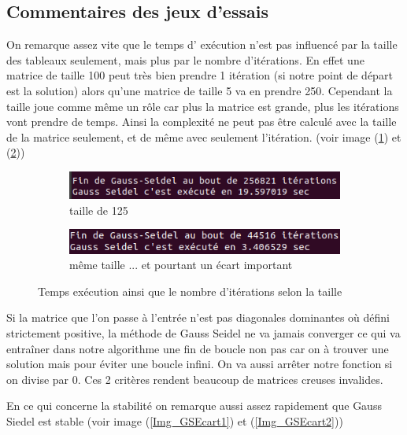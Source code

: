 \documentclass[12pt]{article}
\begin{document}
\subsection{Commentaires des jeux d'essais}

On remarque assez vite que le temps d' exécution n'est pas influencé par la taille des tableaux seulement, mais plus par le nombre d'itérations. En effet une matrice de taille 100 peut très bien prendre 1 itération (si notre point de départ est la solution) alors qu'une matrice de taille 5 va en prendre 250. Cependant la taille joue comme même un rôle car plus la matrice est grande, plus les itérations vont prendre de temps. Ainsi la complexité ne peut pas être calculé avec la taille de la matrice seulement, et de même avec seulement l'itération. (voir image (\ref{Img_GSTemps1}) et (\ref{Img_GSTemps2}))

\begin{figure}[H]
  
  \begin{subfigure}{.5\textwidth}
    \center
    \includegraphics[width=1\linewidth]{img/GSIt1}
    \caption{taille de 125}\label{Img_GSTemps1}
  \end{subfigure}%
  \begin{subfigure}{.5\textwidth}
    \center
    \includegraphics[width=1\linewidth]{img/GSIt2}
    \caption{même taille ... et pourtant un écart important}\label{Img_GSTemps2}
  \end{subfigure}
\caption{Temps exécution ainsi que le nombre d'itérations selon la taille}
\label{Fig_GSTemps}
\end{figure}

Si la matrice que l'on passe à l'entrée n'est pas diagonales dominantes où défini strictement positive, la méthode de Gauss Seidel ne va jamais converger ce qui va entraîner dans notre algorithme une fin de boucle non pas car on à trouver une solution mais pour éviter une boucle infini. On va aussi arrêter notre fonction si on divise par 0. Ces 2 critères rendent beaucoup de matrices creuses invalides. 

En ce qui concerne la stabilité on remarque aussi assez rapidement que Gauss Siedel est stable (voir image (\ref{Img_GSEcart1}) et (\ref{Img_GSEcart2}))
\end{document}
